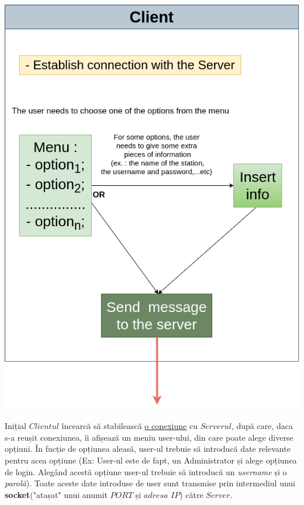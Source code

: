 \documentclass[runningheads]{llncs}
\begin{document}
\begin{center}
\includegraphics[scale=0.45]{diagram_client.png}
\end{center}
Inițial $Clientul$ încearcă să stabilească \hyperlink{sec:detailsConnect}{o conexiune} cu $Serverul$, după care, daca s-a reușit conexiunea, îi afișează un meniu user-ului, din care poate alege diverse opțiuni.
În fucție de opțiunea aleasă, user-ul trebuie să introducă date relevante pentru acea opțiune 
(Ex: User-ul este de fapt, un Administrator și alege opțiunea de login. Alegând acestă opțiune user-ul trebuie să introducă un \textit{username} și o \textit{parolă}).
Toate aceste date introduse de user sunt transmise prin intermediul unui \textbf{socket}("atașat" unui anumit $PORT$ și $adresa$ $IP$) către $Server$.
\end{document}
